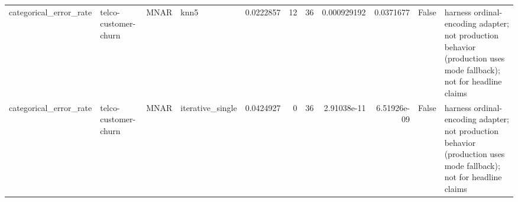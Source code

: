 \begin{table}[ht]
\begin{tabular}{llllrrrrrll}
 categorical\_error\_rate & telco-customer-churn & MNAR        & knn5             &      0.0222857   &                  12 &      36 & 0.000929192 & 0.0371677   & False              & harness ordinal-encoding adapter; not production behavior (production uses mode fallback); not for headline claims \\
 categorical\_error\_rate & telco-customer-churn & MNAR        & iterative\_single &      0.0424927   &                   0 &      36 & 2.91038e-11 & 6.51926e-09 & False              & harness ordinal-encoding adapter; not production behavior (production uses mode fallback); not for headline claims \\
\hline
\end{tabular}
\end{table}
